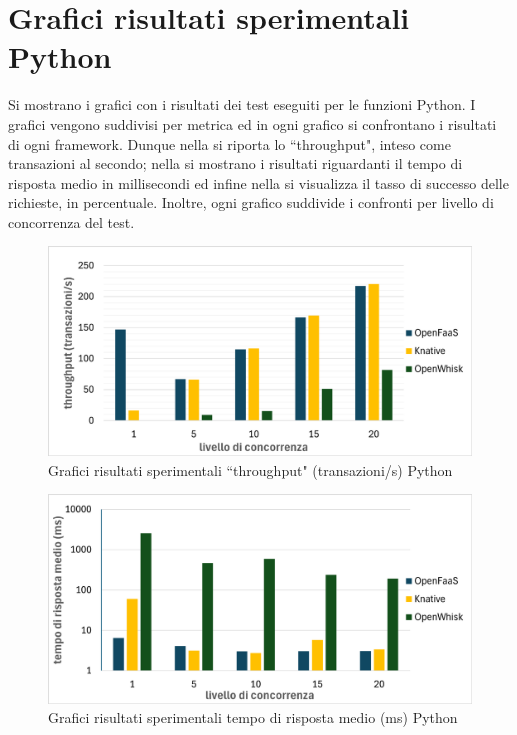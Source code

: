 \documentclass[12pt,a4paper,openany,twoside]{book}
\begin{document}
\section{Grafici risultati sperimentali Python}

Si mostrano i grafici con i risultati dei test eseguiti per le funzioni Python. I grafici vengono suddivisi per metrica ed in ogni grafico si confrontano i risultati di ogni framework. Dunque nella  si riporta lo ``throughput", inteso come transazioni al secondo; nella  si mostrano i risultati riguardanti il tempo di risposta medio in millisecondi ed infine nella  si visualizza il tasso di successo delle richieste, in percentuale. Inoltre, ogni grafico suddivide i confronti per livello di concorrenza del test.

\begin{figure}[h!]
    \centering
    \includegraphics[width=\linewidth]{figures/graphs/throughput_python.pdf}
    \caption{Grafici risultati sperimentali ``throughput" (transazioni/s) Python}
    \label{fig:grafici-throughput-python}
\end{figure}

\begin{figure}[h!]
    \centering
    \includegraphics[width=\linewidth]{figures/graphs/tempoRisposta_python.pdf}
    \caption{Grafici risultati sperimentali tempo di risposta medio (ms) Python}
    \label{fig:grafici-tempo-risposta-python}
\end{figure}
\end{document}
